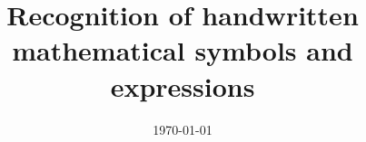 \documentclass[a4paper, 11pt, oneside]{Thesis}  %
\begin{document}
\frontmatter      %
\title  {Recognition of handwritten mathematical symbols and expressions}
\addresses  {\groupname\\\deptname\\\univname}  %
\date       {\today}
\subject    {}
\keywords   {}

\maketitle



\fancyhead{}  %
\rhead{\thepage}  %
\lhead{}  %

\pagestyle{fancy}  %


%
    
\end{document}
